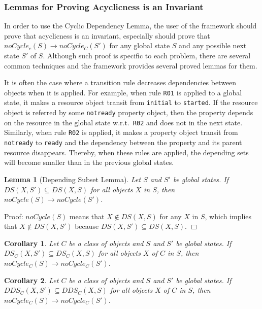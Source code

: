 \documentclass[12pt]{report}
\newtheorem{lemma}{Lemma}
\newtheorem{corollary}{Corollary}
\newcommand{\ra}{\rightarrow}
\begin{document}
\subsubsection{Lemmas for Proving Acyclicness is an Invariant}
In order to use the Cyclic Dependency Lemma, the user of the framework
should prove that acyclicness is an invariant, especially should
prove that $noCycle_c(S) \ra noCycle_C(S')$ for any global state $S$
and any possible next state $S'$ of $S$. Although such proof is
specific to each problem, there are several common techniques and the
framework provides several proved lemmas for them.

It is often the case where a transition rule decreases dependencies
between objects when it is applied. For example, when rule {\tt R01}
is applied to a global state, it makes a resource object transit from
{\tt initial} to {\tt started}. If the resource object is referred by
some {\tt notready} property object, then the property depends on the
resource in the global state w.r.t.\ {\tt R02} and does not in the
next state. Similarly, when rule {\tt R02} is applied, it makes a
property object transit from {\tt notready} to {\tt ready} and the
dependency between the property and its parent resource disappears.
Thereby, when these rules are applied, the depending sets will become
smaller than in the previous global states.

\begin{lemma}[Depending Subset Lemma]
Let $S$ and $S'$ be global states.  If $DS(X,S')\subseteq DS(X,S)$ for all
objects $X$ in $S$, then $noCycle(S) \ra noCycle(S')$.
\end{lemma}
Proof: $noCycle(S)$ means that $X\not\in DS(X,S)$ for any $X$ in $S$,
which implies that $X\not\in DS(X,S')$ because $DS(X,S')\subseteq
DS(X,S)$.  $\Box$

\begin{corollary}
Let $C$ be a class of objects and $S$ and $S'$ be global states.  If
$DS_C(X,S')\subseteq DS_C(X,S)$ for all objects $X$ of $C$ in $S$,
then $noCycle_C(S) \ra noCycle_C(S')$.
\end{corollary}

\begin{corollary}
Let $C$ be a class of objects and $S$ and $S'$ be global states.  If
$DDS_C(X,S')\subseteq DDS_C(X,S)$ for all objects $X$ of $C$ in $S$,
then $noCycle_C(S) \ra noCycle_C(S')$.
\end{corollary}
\end{document}
